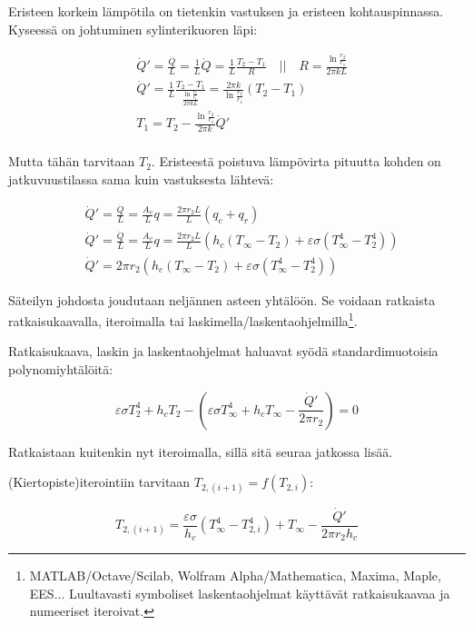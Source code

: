 \documentclass[12pt,a4paper,finnish]{article}
\begin{document}
Eristeen korkein lämpötila on tietenkin vastuksen ja eristeen kohtauspinnassa. Kyseessä on 
johtuminen sylinterikuoren läpi:

\begin{align}
 &\dot{Q}' = \frac{\dot{Q}}{L} = \frac{1}{L}\dot{Q} = \frac{1}{L}\frac{T_2 - T_1}{R}
  \quad \bigg|\bigg| \quad R = \frac{\ln \frac{r_2}{r_1}}{2\pi kL} \\
 &\dot{Q}' = \frac{1}{L}\frac{T_2 - T_1}{\frac{\ln \frac{r_2}{r_1}}{2\pi kL}} 
  = \frac{2\pi k}{\ln \frac{r_2}{r_1}}(T_2 - T_1) \\
 &T_1 = T_2 - \frac{\ln \frac{r_2}{r_1}}{2\pi k}\dot{Q}'\\
\end{align}

Mutta tähän tarvitaan $T_2$. Eristeestä poistuva lämpövirta pituutta kohden on jatkuvuustilassa
sama kuin vastuksesta lähtevä:

\begin{align}
 &\dot{Q}' = \frac{\dot{Q}}{L} = \frac{A_v}{L}q = \frac{2\pi r_2L}{L}(q_c + q_r)\\
 &\dot{Q}' = \frac{\dot{Q}}{L} = \frac{A_v}{L}q 
  = \frac{2\pi r_2L}{L}\left(h_c(T_{\infty} - T_2) + \varepsilon\sigma(T_{\infty}^4 - T_2^4)\right)\\
 &\dot{Q}' = 2\pi r_2\left(h_c(T_{\infty} - T_2) + \varepsilon\sigma(T_{\infty}^4 - T_2^4)\right)
\end{align}

Säteilyn johdosta joudutaan neljännen asteen yhtälöön. Se voidaan ratkaista ratkaisukaavalla, iteroimalla 
tai laskimella/laskentaohjelmilla\footnote{MATLAB/Octave/Scilab, Wolfram Alpha/Mathematica, Maxima, Maple, EES...
Luultavasti symboliset laskentaohjelmat käyttävät ratkaisukaavaa ja numeeriset iteroivat.}.

Ratkaisukaava, laskin ja laskentaohjelmat haluavat syödä standardimuotoisia polynomiyhtälöitä:

\begin{equation}
  \varepsilon\sigma T_2^4 + h_cT_2 
    - \left(\varepsilon\sigma T_{\infty}^4 + h_cT_{\infty} - \frac{\dot{Q}'}{2\pi r_2}\right) = 0
\end{equation}

Ratkaistaan kuitenkin nyt iteroimalla, sillä sitä seuraa jatkossa lisää.

(Kiertopiste)iterointiin tarvitaan $T_{2,(i+1)} = f(T_{2,i})$:

\begin{equation}
 T_{2,(i+1)} = \frac{\varepsilon\sigma}{h_c}(T_{\infty}^4 - T_{2,i}^4) + T_{\infty}
  - \frac{\dot{Q}'}{2\pi r_2h_c}
\end{equation}
\end{document}
